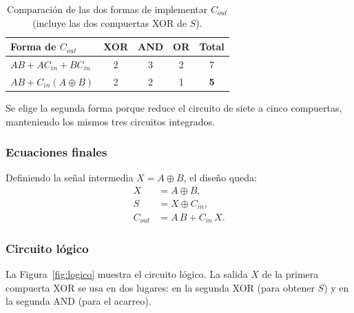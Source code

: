 \documentclass[10pt]{article}
\begin{document}
\begin{table}[!htbp]
  \centering
  \caption{Comparación de las dos formas de implementar $C_{out}$
  (incluye las dos compuertas XOR de $S$).}
  \label{tab:costo}
  \begin{tabular}{lcccc}
    \toprule
    Forma de $C_{out}$ & XOR & AND & OR & Total \\
    \midrule
    $A B + A C_{in} + B C_{in}$ & 2 & 3 & 2 & 7 \\
    $A B + C_{in}(A \oplus B)$  & 2 & 2 & 1 & \textbf{5} \\
    \bottomrule
  \end{tabular}
\end{table}

Se elige la segunda forma porque reduce el circuito de siete a cinco
compuertas, manteniendo los mismos tres circuitos integrados.

\subsubsection{Ecuaciones finales}

Definiendo la señal intermedia $X = A \oplus B$, el diseño queda:
\begin{align}
  X       &= A \oplus B, \\
  S       &= X \oplus C_{in}, \\
  C_{out} &= A\,B + C_{in}\,X.
\end{align}

\subsubsection{Circuito lógico}

La Figura~\ref{fig:logico} muestra el circuito lógico. La salida $X$ de la
primera compuerta XOR se usa en dos lugares: en la segunda XOR (para obtener
$S$) y en la segunda AND (para el acarreo).
\end{document}
